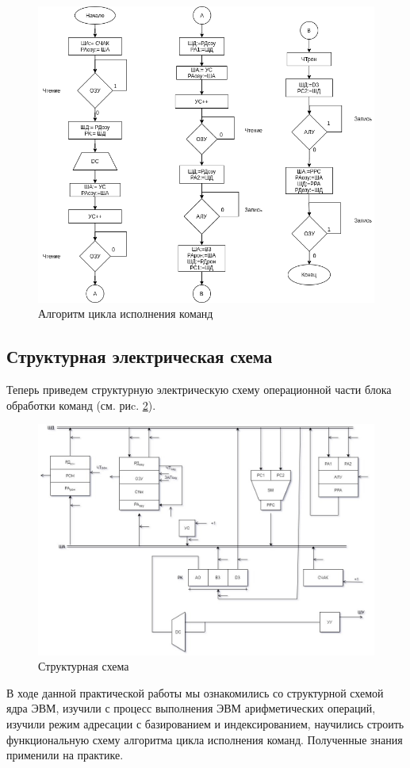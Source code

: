 \documentclass[a4paper,14pt]{extarticle}
\begin{document}
	
	\begin{figure}[htbp]
		\centering
		\includegraphics[width=0.6\linewidth]{images/func-alg3}
		\caption{Алгоритм цикла исполнения команд}
		\label{fig:func-alg}
	\end{figure}
	\newpage
	
	\subsection{Структурная электрическая схема}
	Теперь приведем структурную электрическую схему операционной части блока обработки команд (см. риc. \ref{fig:unit}).
	\begin{figure}[htpb]
		\centering
		\includegraphics[width=0.6\linewidth]{images/pract3}
		\caption{Структурная схема}
		\label{fig:unit}
	\end{figure}
	\newpage
	
	В ходе данной практической работы мы ознакомились со структурной схемой ядра ЭВМ, изучили с процесс выполнения ЭВМ арифметических операций, изучили режим адресации с базированием и индексированием, научились строить функциональную схему алгоритма цикла исполнения команд. Полученные знания применили на практике.
	
	
\end{document}
